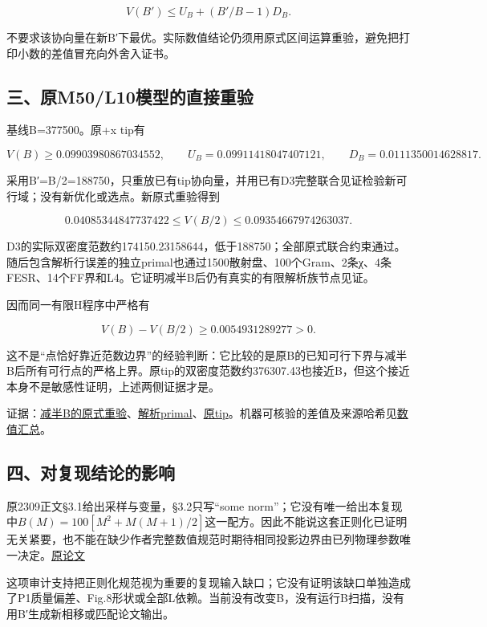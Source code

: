 \documentclass[
  10pt,
  a4paper,
]{article}
\begin{document}
\[
V(B')\le U_B+(B'/B-1)D_B.
\]

不要求该协向量在新B′下最优。实际数值结论仍须用原式区间运算重验，避免把打印小数的差值冒充向外舍入证书。

\subsection{三、原M50/L10模型的直接重验}\label{ux4e09ux539fm50l10ux6a21ux578bux7684ux76f4ux63a5ux91cdux9a8c}

基线B=377500。原+x tip有

\[
V(B)\ge0.09903980867034552,
\qquad U_B=0.09911418047407121,
\qquad D_B=0.0111350014628817.
\]

采用B′=B/2=188750，只重放已有tip协向量，并用已有D3完整联合见证检验新可行域；没有新优化或选点。新原式重验得到

\[
0.04085344847737422\le V(B/2)\le0.09354667974263037.
\]

D3的实际双密度范数约174150.23158644，低于188750；全部原式联合约束通过。随后包含解析行误差的独立primal也通过1500散射盘、100个Gram、2条χ、4条FESR、14个FF界和L4。它证明减半B后仍有真实的有限解析族节点见证。

因而同一有限H程序中严格有

\[
V(B)-V(B/2)\ge0.0054931289277>0.
\]

这不是``点恰好靠近范数边界''的经验判断：它比较的是原B的已知可行下界与减半B后所有可行点的严格上界。原tip的双密度范数约376307.43也接近B，但这个接近本身不是敏感性证明，上述两侧证据才是。

证据：\href{../../../regularizer_half_bound_replay/report.json}{减半B的原式重验}、\href{../../../regularizer_half_analytic/source_audit.json}{解析primal}、\href{../../../../sequential_reproduction_20260910/E1_tip_center/report.json}{原tip}。机器可核验的差值及来源哈希见\href{../../../REGULARIZATION_VALUE_PROOF.json}{数值汇总}。

\subsection{四、对复现结论的影响}\label{ux56dbux5bf9ux590dux73b0ux7ed3ux8bbaux7684ux5f71ux54cd}

原2309正文§3.1给出采样与变量，§3.2只写``some
norm''；它没有唯一给出本复现中\(B(M)=100[M^2+M(M+1)/2]\)这一配方。因此不能说这套正则化已证明无关紧要，也不能在缺少作者完整数值规范时期待相同投影边界由已列物理参数唯一决定。\href{https://arxiv.org/abs/2309.12402v3}{原论文}

这项审计支持把正则化规范视为重要的复现输入缺口；它没有证明该缺口单独造成了P1质量偏差、Fig.8形状或全部L依赖。当前没有改变B，没有运行B扫描，没有用B′生成新相移或匹配论文输出。
\end{document}
